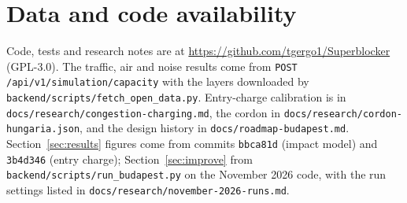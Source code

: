 \documentclass[11pt,a4paper]{article}
\begin{document}
\section*{Data and code availability}
{\sloppy
Code, tests and research notes are at \url{https://github.com/tgergo1/Superblocker} (GPL-3.0). The traffic, air and noise results come from \texttt{POST /api/v1/simulation/capacity} with the layers downloaded by \texttt{backend/scripts/fetch\_open\_data.py}. Entry-charge calibration is in \texttt{docs/research/congestion-charging.md}, the cordon in \texttt{docs/research/cordon-hungaria.json}, and the design history in \texttt{docs/roadmap-budapest.md}. Section~\ref{sec:results} figures come from commits \texttt{bbca81d} (impact model) and \texttt{3b4d346} (entry charge); Section~\ref{sec:improve} from \texttt{backend/scripts/run\_budapest.py} on the November 2026 code, with the run settings listed in \texttt{docs/research/november-2026-runs.md}.\par}
\end{document}
